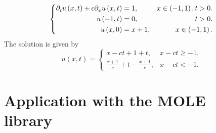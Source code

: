 \documentclass[
	8pt,
	professionalfonts,
	leqno,
	intlimits,
	c,
    aspectratio=1610,
]{beamer}
\begin{document}
\begin{frame}
    \begin{example}
        \begin{equation*}
            \left\{
            \begin{aligned}
                \difcp{u}{t}\left(x,t\right)+
                c
                \difcp{u}{x}\left(x,t\right) & =
                1,                           & x\in\left(-1,1\right), t>0. \\
                u\left(-1,t\right)           & =
                0,                           & t>0.                        \\
                u\left(x,0\right)            & =
                x+1,                         & x\in\left(-1,1\right).
            \end{aligned}
            \right.
        \end{equation*}
        The solution is given by
        \begin{equation*}
            u\left(x,t\right)=
            \begin{cases}
                x-ct + 1 + t,                  & x-ct\geq -1. \\
                \frac{x+1}{c}+t-\frac{x+1}{c}, & x-ct<-1.
            \end{cases}
        \end{equation*}
    \end{example}
\end{frame}

\section{Application with the MOLE library}
\end{document}

